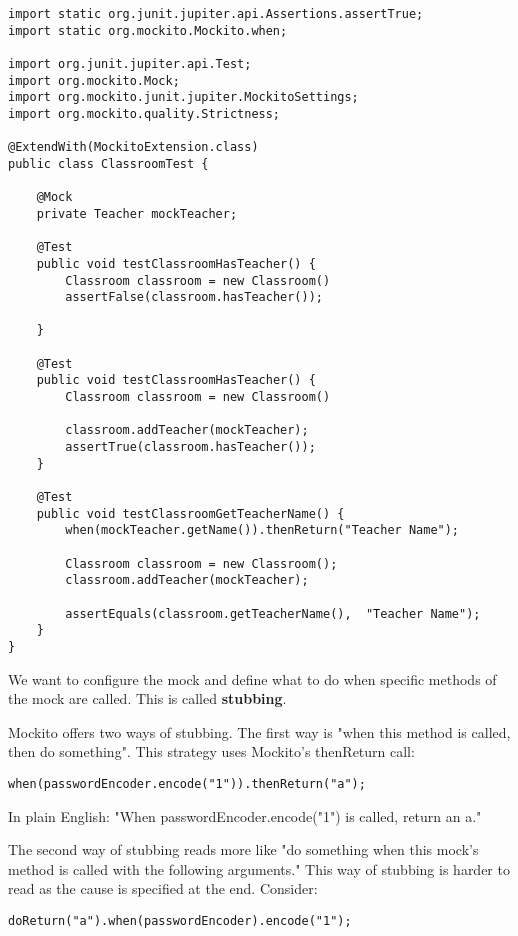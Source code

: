 \begin{lstlisting}
import static org.junit.jupiter.api.Assertions.assertTrue;
import static org.mockito.Mockito.when;

import org.junit.jupiter.api.Test;
import org.mockito.Mock;
import org.mockito.junit.jupiter.MockitoSettings;
import org.mockito.quality.Strictness;

@ExtendWith(MockitoExtension.class)
public class ClassroomTest {
    
    @Mock
    private Teacher mockTeacher;
    
    @Test
    public void testClassroomHasTeacher() {
        Classroom classroom = new Classroom()
        assertFalse(classroom.hasTeacher());
        
    }
    
    @Test
    public void testClassroomHasTeacher() {
        Classroom classroom = new Classroom()
        
        classroom.addTeacher(mockTeacher);
        assertTrue(classroom.hasTeacher());
    }
    
    @Test
    public void testClassroomGetTeacherName() {
        when(mockTeacher.getName()).thenReturn("Teacher Name");
        
        Classroom classroom = new Classroom();
        classroom.addTeacher(mockTeacher);
        
        assertEquals(classroom.getTeacherName(),  "Teacher Name");
    }
}
\end{lstlisting}

We want to configure the mock and define what to do when specific methods of the mock are called. This is called \textbf{stubbing}.

Mockito offers two ways of stubbing. The first way is "when this method is called, then do something". This strategy uses Mockito's thenReturn call:

\begin{lstlisting}
when(passwordEncoder.encode("1")).thenReturn("a");
\end{lstlisting}

In plain English: "When passwordEncoder.encode("1") is called, return an a."

The second way of stubbing reads more like "do something when this mock’s method is called with the following arguments." This way of stubbing is harder to read as the cause is specified at the end. Consider:

\begin{lstlisting}
doReturn("a").when(passwordEncoder).encode("1");
\end{lstlisting}

